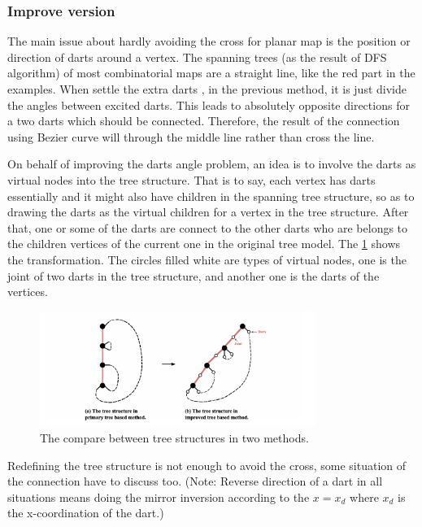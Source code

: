   \subsubsection{Improve version}
  The main issue about hardly avoiding the cross for planar map is the position or direction of darts around a vertex. The spanning trees (as the result of DFS algorithm) of most combinatorial maps are a straight line, like the red part in the examples. When settle the extra darts , in the previous method, it is just divide the angles between excited darts. This leads to absolutely opposite directions for a two darts which should be connected. Therefore, the result of the connection using Bezier curve will through the middle line rather than cross the line.

  On behalf of improving the darts angle problem, an idea is to involve the darts as virtual nodes into the tree structure. That is to say, each vertex has darts essentially and it might also have children in the spanning tree structure, so as to drawing the darts as the virtual children for a vertex in the tree structure. After that, one or some of the darts are connect to the other darts who are belongs to the children vertices of the current one in the original tree model. The \cref{fig:figures:improbvetree} shows the transformation. The circles filled white are types of virtual nodes, one is the joint of two darts in the tree structure, and another one is the darts of the vertices.

  \begin{figure}[htb]
    \centering
    \includegraphics[width=0.8\textwidth]{../../image/improbvetree.png}
    \caption{The compare between tree structures in two methods.}
    \label{fig:figures:improbvetree}
  \end{figure}

  Redefining the tree structure is not enough to avoid the cross, some situation of the connection have to discuss too. (Note: Reverse direction of a dart in all situations means doing the mirror inversion according to the \(x=x_d\) where \(x_d\) is the x-coordination of the dart.)

